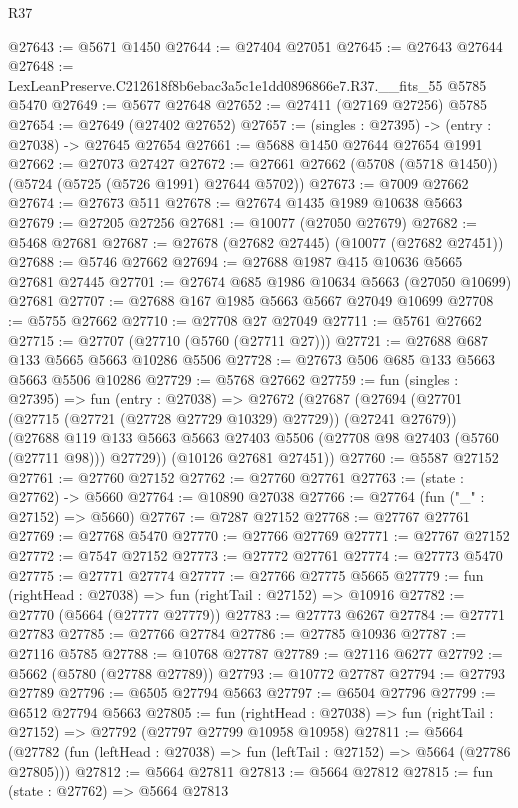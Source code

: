 \begin{lexlean}{R37}
\begin{coremodule}
@27643 := @5671 @1450
@27644 := @27404 @27051
@27645 := @27643 @27644
@27648 := LexLeanPreserve.C212618f8b6ebac3a5c1e1dd0896866e7.R37.__fits_55 @5785 @5470
@27649 := @5677 @27648
@27652 := @27411 (@27169 @27256) @5785
@27654 := @27649 (@27402 @27652)
@27657 := (singles : @27395) -> (entry : @27038) -> @27645 @27654
@27661 := @5688 @1450 @27644 @27654 @1991
@27662 := @27073 @27427
@27672 := @27661 @27662 (@5708 (@5718 @1450)) (@5724 (@5725 (@5726 @1991) @27644 @5702))
@27673 := @7009 @27662
@27674 := @27673 @511
@27678 := @27674 @1435 @1989 @10638 @5663
@27679 := @27205 @27256
@27681 := @10077 (@27050 @27679)
@27682 := @5468 @27681
@27687 := @27678 (@27682 @27445) (@10077 (@27682 @27451))
@27688 := @5746 @27662
@27694 := @27688 @1987 @415 @10636 @5665 @27681 @27445
@27701 := @27674 @685 @1986 @10634 @5663 (@27050 @10699) @27681
@27707 := @27688 @167 @1985 @5663 @5667 @27049 @10699
@27708 := @5755 @27662
@27710 := @27708 @27 @27049
@27711 := @5761 @27662
@27715 := @27707 (@27710 (@5760 (@27711 @27)))
@27721 := @27688 @687 @133 @5665 @5663 @10286 @5506
@27728 := @27673 @506 @685 @133 @5663 @5663 @5506 @10286
@27729 := @5768 @27662
@27759 := fun (singles : @27395) =>
  fun (entry : @27038) =>
  @27672
    (@27687
      (@27694
        (@27701 (@27715 (@27721 (@27728 @27729 @10329) @27729)) (@27241 @27679))
        (@27688 @119 @133 @5663 @5663 @27403 @5506 (@27708 @98 @27403 (@5760 (@27711 @98))) @27729))
      (@10126 @27681 @27451))
@27760 := @5587 @27152
@27761 := @27760 @27152
@27762 := @27760 @27761
@27763 := (state : @27762) -> @5660
@27764 := @10890 @27038
@27766 := @27764 (fun ("_" : @27152) => @5660)
@27767 := @7287 @27152
@27768 := @27767 @27761
@27769 := @27768 @5470
@27770 := @27766 @27769
@27771 := @27767 @27152
@27772 := @7547 @27152
@27773 := @27772 @27761
@27774 := @27773 @5470
@27775 := @27771 @27774
@27777 := @27766 @27775 @5665
@27779 := fun (rightHead : @27038) => fun (rightTail : @27152) => @10916
@27782 := @27770 (@5664 (@27777 @27779))
@27783 := @27773 @6267
@27784 := @27771 @27783
@27785 := @27766 @27784
@27786 := @27785 @10936
@27787 := @27116 @5785
@27788 := @10768 @27787
@27789 := @27116 @6277
@27792 := @5662 (@5780 (@27788 @27789))
@27793 := @10772 @27787
@27794 := @27793 @27789
@27796 := @6505 @27794 @5663
@27797 := @6504 @27796
@27799 := @6512 @27794 @5663
@27805 := fun (rightHead : @27038) =>
  fun (rightTail : @27152) => @27792 (@27797 @27799 @10958 @10958)
@27811 := @5664
    (@27782 (fun (leftHead : @27038) => fun (leftTail : @27152) => @5664 (@27786 @27805)))
@27812 := @5664 @27811
@27813 := @5664 @27812
@27815 := fun (state : @27762) => @5664 @27813

\end{coremodule}
\end{lexlean}
